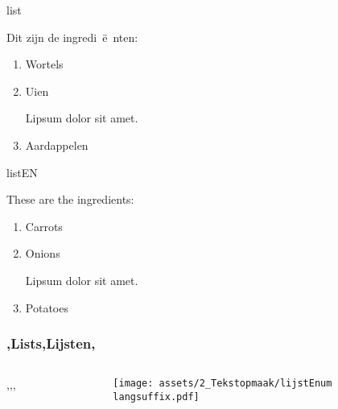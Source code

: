 	
\begin{saveblock}{list}
    \begin{highlightblock}[linewidth=0.5\textwidth,gobble=12]
        Dit zijn de ingredi~\"e~nten:
        \begin{enumerate}
            \item Wortels
            \item Uien
            
            Lipsum dolor sit amet.
            \item Aardappelen
        \end{enumerate}
    \end{highlightblock}
\end{saveblock}

\begin{saveblock}{listEN}
    \begin{highlightblock}[linewidth=0.5\textwidth,gobble=12]
        These are the ingredients:
        \begin{enumerate}
            \item Carrots
            \item Onions
            
            Lipsum dolor sit amet.
            \item Potatoes
        \end{enumerate}
    \end{highlightblock}
\end{saveblock}

\begin{frame}
    \frametitle{\lang,Lists,Lijsten,}
    
    \begin{columns}
        \begin{column}{0.5\textwidth}
            \lang,,,
        \end{column}
        \begin{column}{0.5\textwidth}
                
            \texttt{[image: assets/2\_Tekstopmaak/lijstEnum\\langsuffix.pdf]}
        \end{column}
    \end{columns}
\end{frame}

